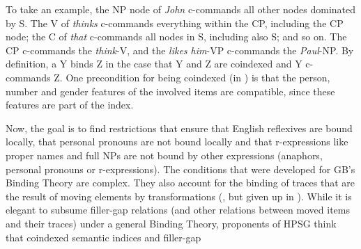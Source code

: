 \documentclass[output=paper,biblatex,babelshorthands,newtxmath,draftmode,colorlinks,citecolor=brown]{langscibook}
\begin{document}
To take an example, the NP node of \emph{John} c-commands all other nodes dominated by S. The V of
\emph{thinks} c-commands everything within the CP, including the CP node; the C of \emph{that}
c-commands all nodes in S, including also S; and so on. The CP c-commands the \emph{think}-V, and the
\emph{likes him}-VP c-commands the \emph{Paul}-NP. By definition, a Y binds Z in the case that Y and Z
are coindexed and Y c-commands Z. One precondition for being coindexed (in ) is that the
person, number and gender features of the involved items are compatible, since these features are
part of the index. 

Now, the goal is to find restrictions that ensure that English reflexives are bound locally, that personal
pronouns are not bound locally and that r-expressions like proper names and full NPs are
not bound by other expressions (anaphors, personal pronouns or r-expressions).
 The conditions that were developed for
GB's Binding Theory are complex. They also account for the binding of traces that are the result of
moving elements by transformations (\citealp{Chomsky81a}, but given up in
\citealp{Chomsky86a}).\label{page-traces-binding} While it is elegant to subsume filler-gap relations (and other relations
between moved items and their traces) under a general Binding Theory, proponents of HPSG think that
coindexed semantic indices and filler-gap
\end{document}
